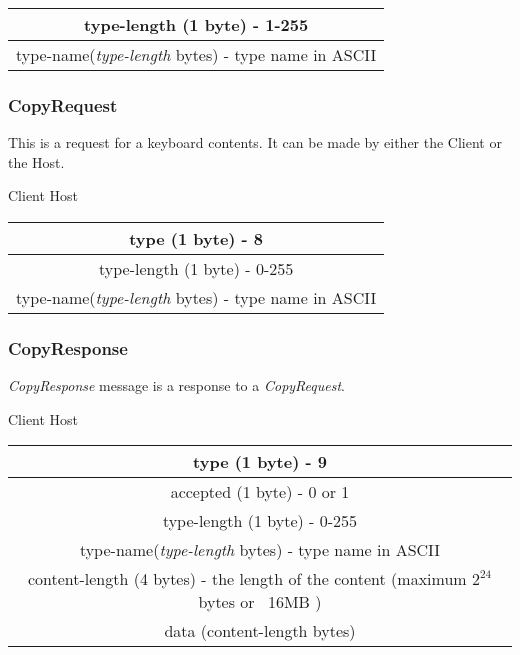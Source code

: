 \documentclass{article}
\begin{document}
    \begin{center}
        \begin{tabular}{|c|}
            \hline
            type-length (1 byte) - 1-255\\
            \hline
            type-name(\emph{type-length} bytes) - type name in ASCII \\
            \hline
        \end{tabular}
    \end{center}

    \subsubsection{CopyRequest}

    This is a request for a keyboard contents. It can be made by either the Client or the Host.

    \begin{center}
        Client \leftrightarrow Host\\
        \begin{tabular}{|c|}
            \hline
            type (1 byte) - 8 \\
            \hline
            type-length (1 byte) - 0-255 \\
            \hline
            type-name(\emph{type-length} bytes) - type name in ASCII \\
            \hline
        \end{tabular}
    \end{center}

    \subsubsection{CopyResponse}

    \emph{CopyResponse} message is a response to a \emph{CopyRequest}.

    \begin{center}
        Client \leftrightarrow Host\\
        \begin{tabular}{|c|}
            \hline
            type (1 byte) - 9 \\
            \hline
            accepted (1 byte) - 0 or 1 \\
            \hline
            type-length (1 byte) - 0-255 \\
            \hline
            type-name(\emph{type-length} bytes) - type name in ASCII \\
            \hline
            content-length (4 bytes) - the length of the content (maximum $2^{24}$ bytes or ~16MB ) \\
            \hline
            data (content-length bytes) \\
            \hline
        \end{tabular}
    \end{center}
\end{document}
